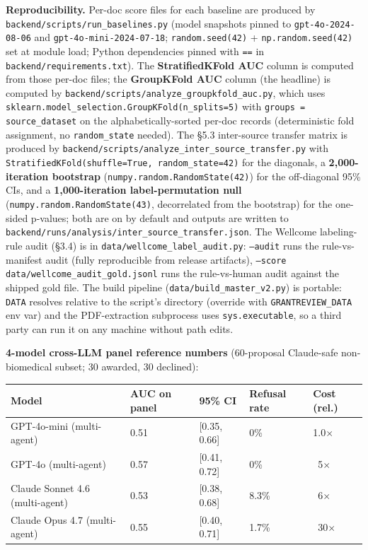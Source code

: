 \documentclass[11pt]{article}
\begin{document}
\textbf{Reproducibility.} Per-doc score files for each baseline are produced by \texttt{backend/scripts/run\_baselines.py} (model snapshots pinned to \texttt{gpt-4o-2024-08-06} and \texttt{gpt-4o-mini-2024-07-18}; \texttt{random.seed(42)} + \texttt{np.random.seed(42)} set at module load; Python dependencies pinned with \texttt{==} in \texttt{backend/requirements.txt}). The \textbf{StratifiedKFold AUC} column is computed from those per-doc files; the \textbf{GroupKFold AUC} column (the headline) is computed by \texttt{backend/scripts/analyze\_groupkfold\_auc.py}, which uses \texttt{sklearn.model\_selection.GroupKFold(n\_splits=5)} with \texttt{groups = source\_dataset} on the alphabetically-sorted per-doc records (deterministic fold assignment, no \texttt{random\_state} needed). The §5.3 inter-source transfer matrix is produced by \texttt{backend/scripts/analyze\_inter\_source\_transfer.py} with \texttt{StratifiedKFold(shuffle=True, random\_state=42)} for the diagonals, a \textbf{2,000-iteration bootstrap} (\texttt{numpy.random.RandomState(42)}) for the off-diagonal 95\% CIs, and a \textbf{1,000-iteration label-permutation null} (\texttt{numpy.random.RandomState(43)}, decorrelated from the bootstrap) for the one-sided p-values; both are on by default and outputs are written to \texttt{backend/runs/analysis/inter\_source\_transfer.json}. The Wellcome labeling-rule audit (§3.4) is in \texttt{data/wellcome\_label\_audit.py}: \texttt{--audit} runs the rule-vs-manifest audit (fully reproducible from release artifacts), \texttt{--score data/wellcome\_audit\_gold.jsonl} runs the rule-vs-human audit against the shipped gold file. The build pipeline (\texttt{data/build\_master\_v2.py}) is portable: \texttt{DATA} resolves relative to the script's directory (override with \texttt{GRANTREVIEW\_DATA} env var) and the PDF-extraction subprocess uses \texttt{sys.executable}, so a third party can run it on any machine without path edits.

\textbf{4-model cross-LLM panel reference numbers} (60-proposal Claude-safe non-biomedical subset; 30 awarded, 30 declined):

\begin{table}[H]
\centering
\small
\begin{tabular}{lllll}
\toprule
Model & AUC on panel & 95\% CI & Refusal rate & Cost (rel.) \\
\midrule
GPT-4o-mini (multi-agent) & 0.51 & [0.35, 0.66] & 0\% & 1.0$\times$ \\
GPT-4o (multi-agent) & 0.57 & [0.41, 0.72] & 0\% & ~5$\times$ \\
Claude Sonnet 4.6 (multi-agent) & 0.53 & [0.38, 0.68] & 8.3\% & ~6$\times$ \\
Claude Opus 4.7 (multi-agent) & 0.55 & [0.40, 0.71] & 1.7\% & ~30$\times$ \\
\bottomrule
\end{tabular}
\end{table}
\end{document}
